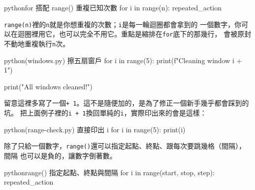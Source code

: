 \begin{code}{python}{for 搭配 range() 重複已知次數}
for i in range(n):
    repeated_action
\end{code}

\texttt{range(n)}裡的\texttt{n}就是你想重複的次數；\texttt{i}是每一輪迴圈都會拿到的
一個數字，你可以在迴圈裡用它，也可以完全不用它。重點是縮排在\texttt{for}底下的那幾行，
會被原封不動地重複執行\texttt{n}次。

\begin{example}{python}{(windows.py) 擦五扇窗戶}
for i in range(5):
    print(f"Cleaning window {i + 1}")

print("All windows cleaned!")
\end{example}


留意這裡多寫了一個\texttt{+ 1}。這不是隨便加的，是為了修正一個新手幾乎都會踩到的坑。
把上面例子裡的\texttt{i + 1}換回單純的\texttt{i}，實際印出來的會是這樣：

\begin{example}{python}{(range-check.py) 直接印出 i}
for i in range(5):
    print(i)
\end{example}



除了只給一個數字，\texttt{range()}還可以指定起點、終點、跟每次要跳幾格（間隔），間隔
也可以是負的，讓數字倒著數。

\begin{code}{python}{range() 指定起點、終點與間隔}
for i in range(start, stop, step):
    repeated_action
\end{code}

